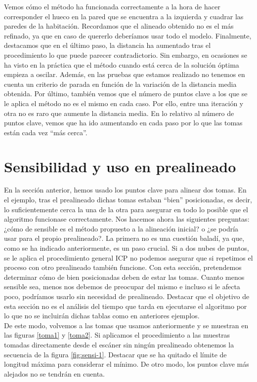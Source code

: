 Vemos cómo el método ha funcionada correctamente a la hora de hacer corresponder el hueco en la pared que se encuentra a la izquierda y cuadrar las paredes de la habitación. Recordamos que el alineado obtenido no es el más refinado, ya que en caso de quererlo deberíamos usar todo el modelo. Finalmente, destacamos que en el último paso, la distancia ha aumentado tras el procedimiento lo que puede parecer contradictorio. Sin embargo, en ocasiones se ha visto en la práctica que el método cuando está cerca de la solución óptima empieza a oscilar. Además,  en las pruebas que estamos realizado no tenemos en cuenta un criterio de parada en función de la variación de la distancia media obtenida. Por último, también vemos que el número de puntos clave a los que se le aplica el método no es el mismo en cada caso. Por ello, entre una iteración y otra no es raro que aumente la distancia media. En lo relativo al número de puntos clave, vemos que ha ido aumentando en cada paso por lo que las tomas están cada vez ``más cerca''.

\section{Sensibilidad y uso en prealineado}
En la sección anterior, hemos usado los puntos clave para alinear dos tomas. En el ejemplo, tras el prealineado dichas tomas estaban ``bien'' posicionadas, es decir, lo suficientemente cerca la una de la otra para asegurar en todo lo posible que el algoritmo funcionase correctamente. Nos hacemos ahora las siguientes preguntas: ¿cómo de sensible es el método propuesto a la alineación inicial? o ¿se podría usar para el propio prealineado?. La primera no es una cuestión baladí, ya que, como se ha indicado anteriormente, es un paso crucial. Si a dos nubes de puntos, se le aplica el procedimiento general ICP no podemos asegurar que si repetimos el proceso con otro prealineado  también funcione. Con esta sección, pretendemos determinar cómo de bien posicionadas deben de estar las tomas. Cuanto menos sensible sea, menos nos debemos de preocupar del mismo e incluso si le afecta poco, podríamos usarlo sin necesidad de prealineado. Destacar que el objetivo de esta sección no es el análisis del tiempo que tarda en ejecutarse el algoritmo por lo que no se incluirán dichas tablas como en anteriores ejemplos.\\

De este modo, volvemos a las tomas que usamos anteriormente y se muestran en las figuras \ref{toma1} y \ref{toma2}. Si aplicamos el procedimiento a las muestras tomadas directamente desde el escáner sin ningún prealineado obtenemos la secuencia de la figura \ref{fig:sensi-1}. Destacar que se ha quitado el límite de longitud máxima para considerar el mínimo. De otro modo, los puntos clave más alejados no se tendrán en cuenta. \\

